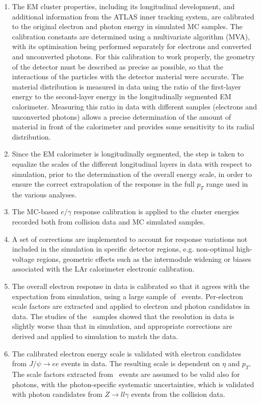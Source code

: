 \begin{enumerate}
\item The EM cluster properties, including its longitudinal development, and additional information from the ATLAS inner tracking system, are calibrated to the original electron and photon energy in simulated MC samples. The calibration constants are determined using a multivariate algorithm (MVA), with its optimisation being performed separately for electrons and converted and unconverted photons. For this calibration to work properly, the geometry of the detector must be described as precise as possible, so that the interactions of the particles with the detector material were accurate. The material distribution is measured in data using the ratio of the first-layer energy to the second-layer energy in the longitudinally segmented EM calorimeter. Measuring this ratio in data with different samples (electrons and unconverted
photons) allows a precise determination of the amount of material in front of the calorimeter and provides some sensitivity to its radial distribution.
\item Since the EM calorimeter is longitudinally segmented, the step is taken to equalize the scales of the different longitudinal layers in data with respect to simulation, prior to the determination of the overall energy scale, in order to ensure the correct extrapolation of the response in the full $p_{T}$ range used in the various analyses.
\item The MC-based $e/\gamma$ response calibration is applied to the cluster energies recorded both from collision data and MC simulated samples.
\item A set of corrections are implemented to account for response variations not included in the simulation in specific detector regions, e.g. non-optimal high-voltage regions, geometric effects such as the intermodule widening or biases associated with the LAr calorimeter electronic calibration.
\item The overall electron response in data is calibrated so that it agrees with the expectation from simulation, using a large sample of \Zee\ events. Per-electron scale factors are extracted and applied to electron and photon candidates in data. The studies of the \Zee\ samples showed that the resolution in data is slightly worse than
that in simulation, and appropriate corrections are derived and applied to simulation to match the data.
\item The calibrated electron energy scale is validated with electron candidates from $J/\psi \to ee$ events in data. The resulting scale is dependent on $\eta$ and $p_{T}$. The scale factors extracted from \Zee\ events are assumed to be valid also for photons, with the photon-specific systematic uncertainties, which is validated with photon candidates from $Z \to ll\gamma$ events from the collision data.
\end{enumerate}

